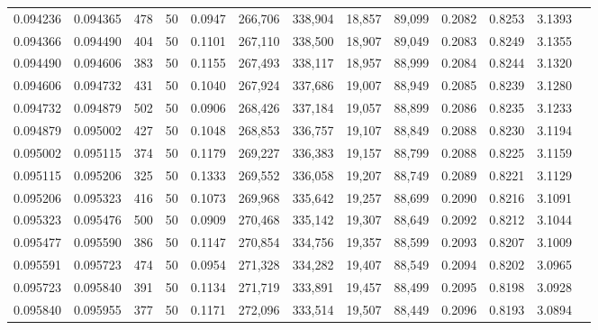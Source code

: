 \begin{tabular}{rrrrrrrrrrrrr}
0.094236 & 0.094365 &   478 &  50 &                                     0.0947 & 266,706 & 338,904 &  18,857 &  89,099 & 0.2082 & 0.8253 & 3.1393 \\
0.094366 & 0.094490 &   404 &  50 &                                     0.1101 & 267,110 & 338,500 &  18,907 &  89,049 & 0.2083 & 0.8249 & 3.1355 \\
0.094490 & 0.094606 &   383 &  50 &                                     0.1155 & 267,493 & 338,117 &  18,957 &  88,999 & 0.2084 & 0.8244 & 3.1320 \\
0.094606 & 0.094732 &   431 &  50 &                                     0.1040 & 267,924 & 337,686 &  19,007 &  88,949 & 0.2085 & 0.8239 & 3.1280 \\
0.094732 & 0.094879 &   502 &  50 &                                     0.0906 & 268,426 & 337,184 &  19,057 &  88,899 & 0.2086 & 0.8235 & 3.1233 \\
0.094879 & 0.095002 &   427 &  50 &                                     0.1048 & 268,853 & 336,757 &  19,107 &  88,849 & 0.2088 & 0.8230 & 3.1194 \\
0.095002 & 0.095115 &   374 &  50 &                                     0.1179 & 269,227 & 336,383 &  19,157 &  88,799 & 0.2088 & 0.8225 & 3.1159 \\
0.095115 & 0.095206 &   325 &  50 &                                     0.1333 & 269,552 & 336,058 &  19,207 &  88,749 & 0.2089 & 0.8221 & 3.1129 \\
0.095206 & 0.095323 &   416 &  50 &                                     0.1073 & 269,968 & 335,642 &  19,257 &  88,699 & 0.2090 & 0.8216 & 3.1091 \\
0.095323 & 0.095476 &   500 &  50 &                                     0.0909 & 270,468 & 335,142 &  19,307 &  88,649 & 0.2092 & 0.8212 & 3.1044 \\
0.095477 & 0.095590 &   386 &  50 &                                     0.1147 & 270,854 & 334,756 &  19,357 &  88,599 & 0.2093 & 0.8207 & 3.1009 \\
0.095591 & 0.095723 &   474 &  50 &                                     0.0954 & 271,328 & 334,282 &  19,407 &  88,549 & 0.2094 & 0.8202 & 3.0965 \\
0.095723 & 0.095840 &   391 &  50 &                                     0.1134 & 271,719 & 333,891 &  19,457 &  88,499 & 0.2095 & 0.8198 & 3.0928 \\
0.095840 & 0.095955 &   377 &  50 &                                     0.1171 & 272,096 & 333,514 &  19,507 &  88,449 & 0.2096 & 0.8193 & 3.0894 \\

\end{tabular}
